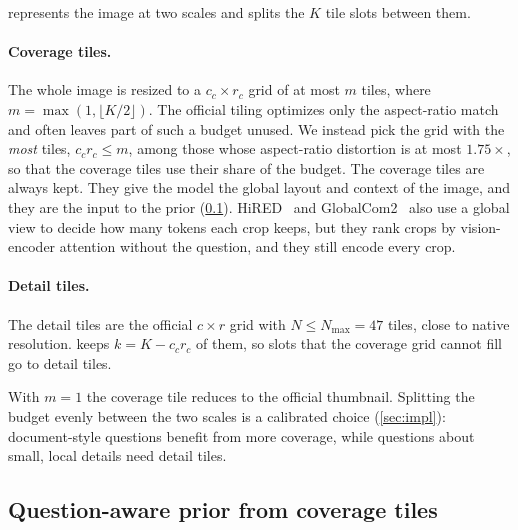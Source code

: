 \method represents the image at two scales and splits the $K$ tile slots between them.

\paragraph{Coverage tiles.} The whole image is resized to a $c_c\times r_c$ grid of at most $m$ tiles,
where $m=\max(1,\lfloor K/2\rfloor)$. The official tiling optimizes only the aspect-ratio match and
often leaves part of such a budget unused. We instead pick the grid with the \emph{most} tiles,
$c_c r_c\le m$, among those whose aspect-ratio distortion is at most $1.75\times$, so that the coverage
tiles use their share of the budget. The coverage tiles are always kept. They give the model the global layout
and context of the image, and they are the input to the prior (\cref{sec:prior}). HiRED~\cite{hired} and
GlobalCom2~\cite{globalcom2} also use a global view to decide how many tokens each crop keeps, but they
rank crops by vision-encoder attention without the question, and they still encode every crop.

\paragraph{Detail tiles.} The detail tiles are the official $c\times r$ grid with $N\le N_{\max}=47$
tiles, \ie close to native resolution. \method keeps $k=K-c_cr_c$ of them, so slots that the coverage grid
cannot fill go to detail tiles.

With $m=1$ the coverage tile reduces to the official thumbnail. Splitting the budget evenly between
the two scales is a calibrated choice (\cref{sec:impl}): document-style questions benefit from more
coverage, while questions about small, local details need detail tiles.

\subsection{Question-aware prior from coverage tiles}
\label{sec:prior}

